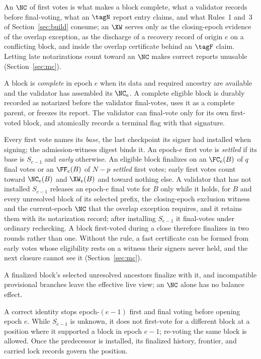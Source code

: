 An $\NC$ of first votes is what makes a block complete, what a validator records before final-voting, what an $\tagN$ report entry claims, and what Rules~1 and~3 of Section~\ref{sec:build} consume; an $\XW$ serves only as the closing-epoch evidence of the overlap exception, as the discharge of a recovery record of origin $e$ on a conflicting block, and inside the overlap certificate behind an $\tagF$ claim. Letting late notarizations count toward an $\NC$ makes correct reports unusable (Section~\ref{sec:mc}).

A block is \emph{complete} in epoch $e$ when its data and required ancestry are available and the validator has assembled its $\NC_e$. A complete eligible block is durably recorded as notarized before the validator final-votes, uses it as a complete parent, or freezes its report. The validator can final-vote only for its own first-voted block, and atomically records a terminal flag with that signature.

Every first vote names its \emph{base}, the last checkpoint its signer had installed when signing; the admission-witness digest binds it. An epoch-$e$ first vote is \emph{settled} if its base is $S_{e-1}$ and \emph{early} otherwise. An eligible block finalizes on an $\FC_e(B)$ of $q$ final votes or an $\FF_e(B)$ of $N-p$ \emph{settled} first votes; early first votes count toward $\NC_e(B)$ and $\XW_e(B)$ and toward nothing else. A validator that has not installed $S_{e-1}$ releases an epoch-$e$ final vote for $B$ only while it holds, for $B$ and every unresolved block of its selected prefix, the closing-epoch exclusion witness and the current-epoch $\NC$ that the overlap exception requires, and it retains them with its notarization record; after installing $S_{e-1}$ it final-votes under ordinary rechecking. A block first-voted during a close therefore finalizes in two rounds rather than one. Without the rule, a fast certificate can be formed from early votes whose eligibility rests on a witness their signers never held, and the next closure cannot see it (Section~\ref{sec:mc}).

A finalized block's selected unresolved ancestors finalize with it, and incompatible provisional branches leave the effective live view; an $\NC$ alone has no balance effect.

A correct identity stops epoch-$(e-1)$ first and final voting before opening epoch $e$. While $S_{e-1}$ is unknown, it does not first-vote for a different block at a position where it supported a block in epoch $e-1$; re-voting the same block is allowed. Once the predecessor is installed, its finalized history, frontier, and carried lock records govern the position.

